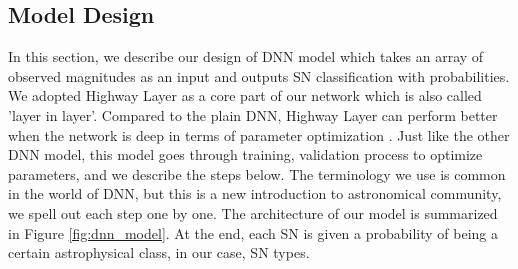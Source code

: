 \documentclass[useamsfonts]{pasj01}
\begin{document}
\subsection{Model Design}
\label{sec:model} %
In this section, we describe our design of DNN model which takes an array of observed magnitudes as an input and outputs SN classification with probabilities.  We adopted Highway Layer \citep{srivastava15a} as a core part of our network which is also called 'layer in layer'.  Compared to the plain DNN, Highway Layer can perform better when the network is deep in terms of parameter optimization \citep{srivastava15b}.   
Just like the other DNN model, this model goes through training, validation process to optimize parameters, and we describe the steps below.  The terminology we use is common in the world of DNN, but this is a new introduction to astronomical community, we spell out each step one by one.  The architecture of our model is summarized in Figure \ref{fig:dnn_model}.
At the end, each SN is given a probability of being a certain astrophysical class, in our case, SN types. 
%
\end{document}
